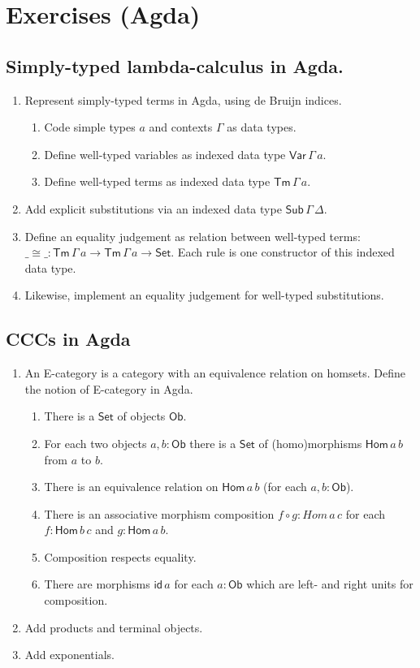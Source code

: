 \documentclass[a4paper]{scrartcl}
\newcommand{\wttm}{\ensuremath{\mathsf{Tm}\,\Gamma\,a}}
\newcommand{\Set}{\mathsf{Set}}
\newcommand{\Ob}{\mathsf{Ob}}
\newcommand{\Hom}{\mathsf{Hom}}
\newcommand{\tid}{\mathsf{id}}
\begin{document}
\clearpage

\section{Exercises (Agda)}

\subsection{Simply-typed lambda-calculus in Agda.}

\begin{enumerate}
\item Represent simply-typed terms in Agda, using de Bruijn indices.
  \begin{enumerate}
  \item Code simple types $a$ and contexts $\Gamma$ as data types.
  \item Define well-typed variables as indexed data type
    $\mathsf{Var}\,\Gamma\,a$.
  \item Define well-typed terms as indexed data type \wttm.
  \end{enumerate}
\item Add explicit substitutions via an indexed data type
  $\mathsf{Sub}\,\Gamma\,\Delta$.
\item Define an equality judgement as relation between well-typed
  terms: $\_\cong\_ : \wttm \to \wttm \to \mathsf{Set}$.
  Each rule is one constructor of this indexed data type.
\item Likewise, implement an equality judgement for well-typed substitutions.
\end{enumerate}

\subsection{CCCs in Agda}
\begin{enumerate}
\item An E-category is a category with an equivalence relation on
  homsets.  Define the notion of E-category in Agda.
  \begin{enumerate}
  \item There is a $\Set$ of objects $\Ob$.
  \item For each two objects $a,b : \Ob$
    there is a $\Set$ of (homo)morphisms $\Hom\,a\,b$ from $a$ to $b$.
  \item There is an equivalence relation on $\Hom\,a\,b$ (for each
    $a,b : \Ob$).
  \item There is an associative morphism composition $f \circ g : Hom\,a\,c$ for each
    $f : \Hom\,b\,c$ and $g : \Hom\,a\,b$.
  \item Composition respects equality.
  \item There are morphisms $\tid\,a$ for each $a : \Ob$ which are
    left- and right units for composition.
  \end{enumerate}
\item Add products and terminal objects.
\item Add exponentials.
\end{enumerate}
\end{document}

